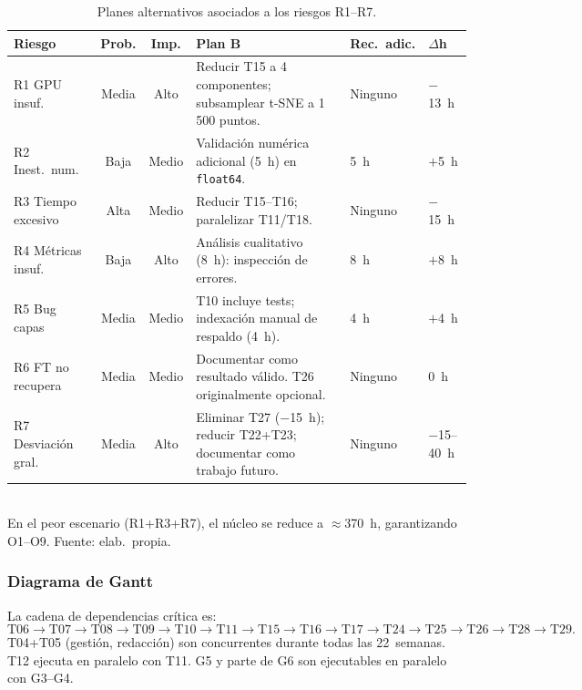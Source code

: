 \begin{table}[H]
\centering
\caption{Planes alternativos asociados a los riesgos R1--R7.}
\label{tab:gep-planesb}
\footnotesize
\begin{tabular}{@{}p{2.1cm} c c p{5.3cm} p{1.5cm} p{1.2cm}@{}}
\toprule
\textbf{Riesgo} & \textbf{Prob.} & \textbf{Imp.} & \textbf{Plan B} & \textbf{Rec.\ adic.} & \textbf{$\Delta$h} \\
\midrule
R1 GPU insuf.       & Media & Alto  & Reducir T15 a 4 componentes; subsamplear t-SNE a 1\,500 puntos. & Ninguno & $-$13~h \\
\midrule
R2 Inest.\ num.     & Baja  & Medio & Validación numérica adicional (5~h) en \texttt{float64}. & 5~h & $+$5~h \\
\midrule
R3 Tiempo excesivo  & Alta  & Medio & Reducir T15--T16; paralelizar T11/T18. & Ninguno & $-$15~h \\
\midrule
R4 Métricas insuf.  & Baja  & Alto  & Análisis cualitativo (8~h): inspección de errores. & 8~h & $+$8~h \\
\midrule
R5 Bug capas        & Media & Medio & T10 incluye tests; indexación manual de respaldo (4~h). & 4~h & $+$4~h \\
\midrule
R6 FT no recupera   & Media & Medio & Documentar como resultado válido. T26 originalmente opcional. & Ninguno & 0~h \\
\midrule
R7 Desviación gral. & Media & Alto  & Eliminar T27 ($-$15~h); reducir T22+T23; documentar como trabajo futuro. & Ninguno & $-$15--40~h \\
\bottomrule
\end{tabular}
\\[0.15cm]{\small En el peor escenario (R1+R3+R7), el núcleo se reduce a $\approx$370~h, garantizando O1--O9. Fuente: elab.\ propia.}
\end{table}

\subsubsection{Diagrama de Gantt}

La cadena de dependencias crítica es:
\[
\text{T06} \to \text{T07} \to \text{T08} \to \text{T09} \to \text{T10}
\to \text{T11} \to \text{T15} \to \text{T16} \to \text{T17} \to \text{T24} \to
\text{T25} \to \text{T26} \to \text{T28} \to \text{T29}.
\]
T04+T05 (gestión, redacción) son concurrentes durante todas las
22~semanas. T12 ejecuta en paralelo con T11. G5 y parte de G6 son
ejecutables en paralelo con G3--G4.

